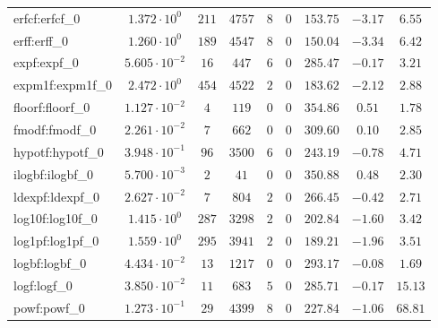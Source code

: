 \begin{tabular}{|l|c|c|c|c|c|c|c|c|}
erfcf:erfcf\_0               & $ 1.372 \cdot 10^{0}  $ & $ 211    $ & $ 4757   $ & $ 8   $ & $ 0   $ & $ 153.75      $ & $ -3.17   $ & $ 6.55    $ \\
erff:erff\_0                 & $ 1.260 \cdot 10^{0}  $ & $ 189    $ & $ 4547   $ & $ 8   $ & $ 0   $ & $ 150.04      $ & $ -3.34   $ & $ 6.42    $ \\
expf:expf\_0                 & $ 5.605 \cdot 10^{-2} $ & $ 16     $ & $ 447    $ & $ 6   $ & $ 0   $ & $ 285.47      $ & $ -0.17   $ & $ 3.21    $ \\
expm1f:expm1f\_0             & $ 2.472 \cdot 10^{0}  $ & $ 454    $ & $ 4522   $ & $ 2   $ & $ 0   $ & $ 183.62      $ & $ -2.12   $ & $ 2.88    $ \\
floorf:floorf\_0             & $ 1.127 \cdot 10^{-2} $ & $ 4      $ & $ 119    $ & $ 0   $ & $ 0   $ & $ 354.86      $ & $ 0.51    $ & $ 1.78    $ \\
fmodf:fmodf\_0               & $ 2.261 \cdot 10^{-2} $ & $ 7      $ & $ 662    $ & $ 0   $ & $ 0   $ & $ 309.60      $ & $ 0.10    $ & $ 2.85    $ \\
hypotf:hypotf\_0             & $ 3.948 \cdot 10^{-1} $ & $ 96     $ & $ 3500   $ & $ 6   $ & $ 0   $ & $ 243.19      $ & $ -0.78   $ & $ 4.71    $ \\
ilogbf:ilogbf\_0             & $ 5.700 \cdot 10^{-3} $ & $ 2      $ & $ 41     $ & $ 0   $ & $ 0   $ & $ 350.88      $ & $ 0.48    $ & $ 2.30    $ \\
ldexpf:ldexpf\_0             & $ 2.627 \cdot 10^{-2} $ & $ 7      $ & $ 804    $ & $ 2   $ & $ 0   $ & $ 266.45      $ & $ -0.42   $ & $ 2.71    $ \\
log10f:log10f\_0             & $ 1.415 \cdot 10^{0}  $ & $ 287    $ & $ 3298   $ & $ 2   $ & $ 0   $ & $ 202.84      $ & $ -1.60   $ & $ 3.42    $ \\
log1pf:log1pf\_0             & $ 1.559 \cdot 10^{0}  $ & $ 295    $ & $ 3941   $ & $ 2   $ & $ 0   $ & $ 189.21      $ & $ -1.96   $ & $ 3.51    $ \\
logbf:logbf\_0               & $ 4.434 \cdot 10^{-2} $ & $ 13     $ & $ 1217   $ & $ 0   $ & $ 0   $ & $ 293.17      $ & $ -0.08   $ & $ 1.69    $ \\
logf:logf\_0                 & $ 3.850 \cdot 10^{-2} $ & $ 11     $ & $ 683    $ & $ 5   $ & $ 0   $ & $ 285.71      $ & $ -0.17   $ & $ 15.13   $ \\
powf:powf\_0                 & $ 1.273 \cdot 10^{-1} $ & $ 29     $ & $ 4399   $ & $ 8   $ & $ 0   $ & $ 227.84      $ & $ -1.06   $ & $ 68.81   $ \\

\end{tabular}
